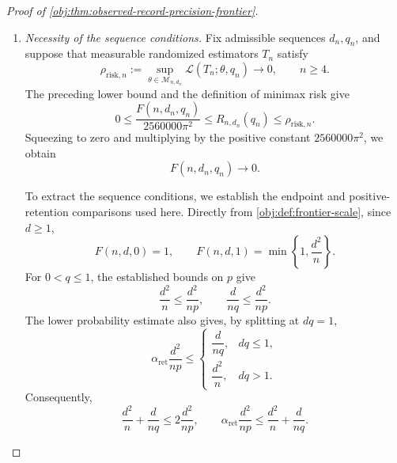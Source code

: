 \begin{proof}[Proof of \cref{obj:thm:observed-record-precision-frontier}]
\begin{enumerate}
Take the opposite-sign priors of \cref{obj:def:block-prior} at amplitude \(h\).
By \cref{obj:lem:block-law}, they are supported almost surely in
\(\mathcal M_{n,d}\), with constant targets \(\pm\Delta\), where
\[
\Delta=\frac{mh}{n}>0.
\]
The record maps are jointly measurable: the partition and binary coordinates
are finite, and the outcomes depend affinely on the real baseline coordinates.
The block and amplitude conditions established above allow
\cref{obj:thm:block-testing-scale} to give
\[
\operatorname{TV}(P_{+1,h},P_{-1,h})\le\frac12.
\]
Applying \cref{obj:lem:full-record-two-prior-risk} therefore yields
\[
R_{n,d}(q)
\ge\frac{\Delta^2}{2}
       \bigl(1-\operatorname{TV}(P_{+1,h},P_{-1,h})\bigr)
\ge\frac{\Delta^2}{4}.
\]
Finally, \(m/n\ge1/4\) implies
\[
\frac{\kappa s}{4}
\le\frac{m\kappa s}{n}
=\Delta.
\]
Hence
\[
\begin{aligned}
\frac{F(n,d,q)}{2560000\pi^2}
&\le\frac{s^2}{2560000\pi^2}
\le\frac{s^2}{640000\pi^2}\\
&=\frac14\left(\frac{\kappa s}{4}\right)^2
\le\frac{\Delta^2}{4}
\le R_{n,d}(q).
\end{aligned}
\]
This proves the lower bound in both degree regimes, including \(q=0\).

\item \textit{Necessity of the sequence conditions.}
Fix admissible sequences \(d_n,q_n\), and suppose that measurable randomized
estimators \(T_n\) satisfy
\[
\rho_{\mathrm{risk},n}
:=
\sup_{\theta\in\mathcal M_{n,d_n}}
\mathcal L(T_n;\theta,q_n)
\longrightarrow0,
\qquad n\ge4.
\]
The preceding lower bound and the definition of minimax risk give
\[
0\le
\frac{F(n,d_n,q_n)}{2560000\pi^2}
\le R_{n,d_n}(q_n)
\le\rho_{\mathrm{risk},n}.
\]
Squeezing to zero and multiplying by the positive constant
\(2560000\pi^2\), we obtain
\[
F(n,d_n,q_n)\longrightarrow0.
\]

To extract the sequence conditions, we establish the endpoint and
positive-retention comparisons used here. Directly from
\cref{obj:def:frontier-scale}, since \(d\ge1\),
\[
F(n,d,0)=1,
\qquad
F(n,d,1)=\min\left\{1,\frac{d^2}{n}\right\}.
\]
For \(0<q\le1\), the established bounds on \(p\) give
\[
\frac{d^2}{n}\le\frac{d^2}{np},
\qquad
\frac{d}{nq}\le\frac{d^2}{np}.
\]
The lower probability estimate also gives, by splitting at \(dq=1\),
\[
\alpha_{\mathrm{ret}}\frac{d^2}{np}
\le
\begin{cases}
\dfrac{d}{nq},&dq\le1,\\[4pt]
\dfrac{d^2}{n},&dq>1.
\end{cases}
\]
Consequently,
\[
\frac{d^2}{n}+\frac{d}{nq}\le2\frac{d^2}{np},
\qquad
\alpha_{\mathrm{ret}}\frac{d^2}{np}
\le\frac{d^2}{n}+\frac{d}{nq}.
\]


\end{enumerate}
\end{proof}
